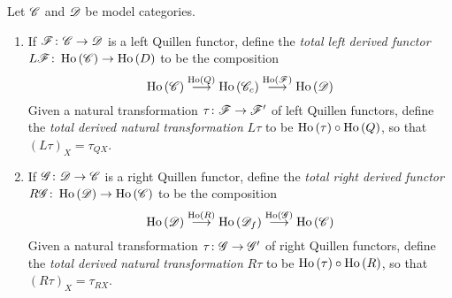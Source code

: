 \documentclass[10pt]{amsart}
\begin{document}
\begin{defn}
  Let $\C$ and $\D$ be model categories.
  \begin{enumerate}
  \item
    If $\F \colon \C \to \D$ is a left Quillen functor, define the {\it total left derived functor} $L\F \colon \Ho{\C} \to \Ho{D}$ to be the composition
    $$\Ho{\C} \overset{\Ho{Q}}\longrightarrow \Ho{\C_c} \overset{\Ho{\F}}\longrightarrow \Ho{\D}$$
    Given a natural transformation $\tau \colon \F \to \F^\prime$ of left Quillen functors, define the {\it total derived natural transformation} $L\tau$ to be $\Ho{\tau} \circ \Ho{Q}$, so that $(L\tau)_X = \tau_{QX}$.
  \item
    If $\G \colon \D \to \C$ is a right Quillen functor, define the {\it total right derived functor} $R\G \colon \Ho{\D} \to \Ho{\C}$ to be the composition
    $$\Ho{\D} \overset{\Ho{R}}\longrightarrow \Ho{\D_f} \overset{\Ho{\G}}\longrightarrow \Ho{\C}$$
    Given a natural transformation $\tau \colon \G \to \G^\prime$ of right Quillen functors, define the {\it total derived natural transformation} $R\tau$ to be $\Ho{\tau} \circ \Ho{R}$, so that $(R\tau)_X = \tau_{RX}$.
  \end{enumerate}
\end{defn}
\end{document}

